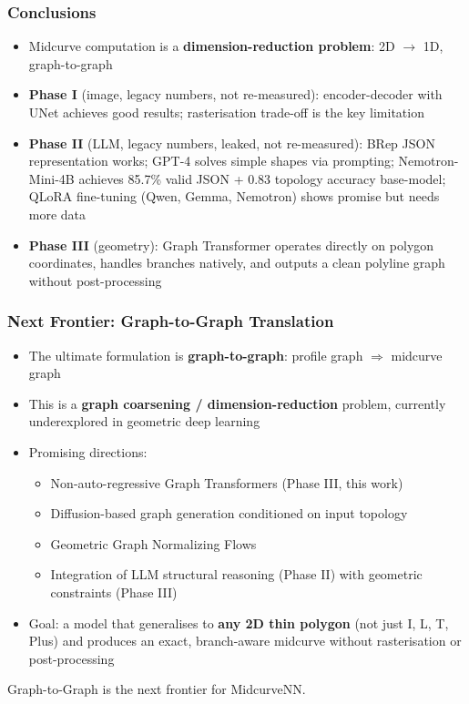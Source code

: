 \begin{frame}[fragile]\frametitle{Conclusions}
	\begin{itemize}
	\item Midcurve computation is a \textbf{dimension-reduction problem}: 2D $\rightarrow$ 1D, graph-to-graph
	\item \textbf{Phase I} (image, legacy numbers, not re-measured): encoder-decoder with UNet achieves good results; rasterisation trade-off is the key limitation
	\item \textbf{Phase II} (LLM, legacy numbers, leaked, not re-measured): BRep JSON representation works; GPT-4 solves simple shapes via prompting; Nemotron-Mini-4B achieves 85.7\% valid JSON + 0.83 topology accuracy base-model; QLoRA fine-tuning (Qwen, Gemma, Nemotron) shows promise but needs more data
	\item \textbf{Phase III} (geometry): Graph Transformer operates directly on polygon coordinates, handles branches natively, and outputs a clean polyline graph without post-processing
	\end{itemize}
\end{frame}

\begin{frame}[fragile]\frametitle{Next Frontier: Graph-to-Graph Translation}

	\begin{itemize}
	\item The ultimate formulation is \textbf{graph-to-graph}: profile graph $\Rightarrow$ midcurve graph
	\item This is a \textbf{graph coarsening / dimension-reduction} problem, currently underexplored in geometric deep learning
	\item Promising directions:
		\begin{itemize}
		\item Non-auto-regressive Graph Transformers (Phase III, this work)
		\item Diffusion-based graph generation conditioned on input topology
		\item Geometric Graph Normalizing Flows
		\item Integration of LLM structural reasoning (Phase II) with geometric constraints (Phase III)
		\end{itemize}
	\item Goal: a model that generalises to \textbf{any 2D thin polygon} (not just I, L, T, Plus) and produces an exact, branch-aware midcurve without rasterisation or post-processing
	\end{itemize}

\begin{center}
\alert{\Large Graph-to-Graph is the next frontier for MidcurveNN.}
\end{center}
\end{frame}
